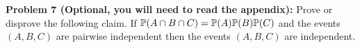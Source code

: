 \documentclass[11pt]{article} %
\begin{document}
\noindent \textbf{Problem 7 (Optional, you will need to read the appendix):}  Prove or disprove the following claim. If $\mathbb{P}(A \cap B \cap C)=\mathbb{P}(A)\mathbb{P}(B)\mathbb{P}(C)$ and the events $(A, B, C)$ are pairwise independent then the events $(A, B, C)$ are independent. \\




\end{document}
